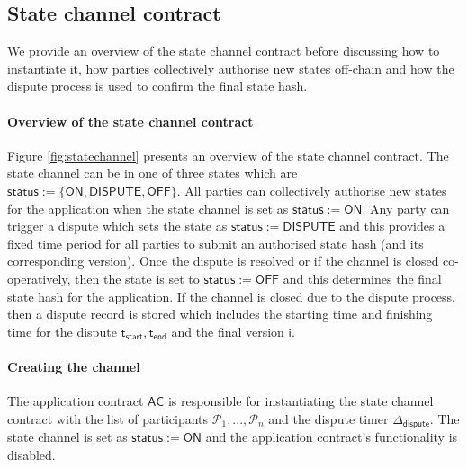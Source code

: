 \documentclass{llncs}
\newcommand{\chanstatus}{\mathsf{status}}
\newcommand{\chanon}{\mathsf{ON}}
\newcommand{\chandispute}{\mathsf{DISPUTE}}
\newcommand{\chanoff}{\mathsf{OFF}}
\newcommand{\hstatei}{\mathsf{hstate}_{\monotoniccounter}}
\newcommand{\monotoniccounter}{\mathsf{i}}
\newcommand{\stateinfoi}{\mathsf{state}_{\mathsf{i}}}
\newcommand{\participant}{\mathcal{P}}
\newcommand{\rani}{\mathsf{r}_{\mathsf{i}}}
\newcommand{\ran}{\mathsf{r}}
\newcommand{\statechannel}{\mathsf{SC}}
\newcommand{\sign}{\mathsf{Sign}}
\newcommand{\appcontract}{\mathsf{AC}}
\newcommand{\timerdispute}{\mathsf{\Delta}_{\mathsf{dispute}}}
\newcommand{\timestart}{\mathsf{t}_{\mathsf{start}}}
\newcommand{\timeend}{\mathsf{t}_{\mathsf{end}}}
\begin{document}
\subsection{State channel contract}

We provide an overview of the state channel contract before discussing how to instantiate it,  how parties collectively authorise new states off-chain and how the dispute process is used to confirm the final state hash. 

\paragraph{Overview of the state channel contract} 
Figure \ref{fig:statechannel} presents an overview of the state channel contract.
The state channel can be in one of three states which are $\chanstatus := \{\chanon, \chandispute, \chanoff\}$.
All parties can collectively authorise new states for the application when the state channel is set as $\chanstatus := \chanon$.
Any party can trigger a dispute which sets the state as $\chanstatus := \chandispute$ and this provides a fixed time period for all parties to submit an authorised state hash (and its corresponding version).
Once the dispute is resolved or if the channel is closed co-operatively, then the state is set to $\chanstatus := \chanoff$ and this determines the final state hash for the application. 
If the channel is closed due to the dispute process, then a dispute record is stored which includes the starting time and finishing time for the dispute $\timestart, \timeend$ and the final version $\monotoniccounter$.

\paragraph{Creating the channel} 

The application contract $\appcontract$ is responsible for instantiating the state channel contract with the list of participants $\participant_{1},...,\participant_{n}$ and the dispute timer $\timerdispute$.
The state channel is set as $\chanstatus := \chanon$ and the application contract's functionality is disabled. 

\end{document}
